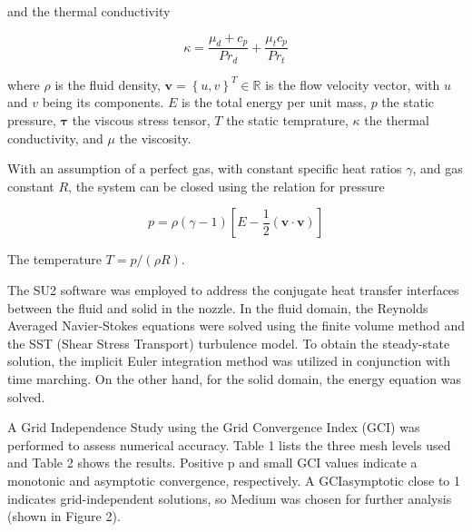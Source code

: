 and the thermal conductivity

\begin{equation}
    \kappa = \frac{\mu_d + c_p}{Pr_d} + \frac{\mu_t c_p}{Pr_t}
    \label{eq:kappa}
\end{equation}

where $\rho$ is the fluid density, $\mathbf{v} = \left\{ u , v \right\}^T \in \mathbb{R}$ is the flow velocity vector, with $u$ and $v$ being its components. $E$ is the total energy per unit mass, $p$ the static pressure, $\boldsymbol{\tau}$ the viscous stress tensor, $T$ the static temprature, $\kappa$ the thermal conductivity, and $\mu$ the viscosity.

With an assumption of a perfect gas, with constant specific heat ratios $\gamma$, and gas constant $R$, the system can be closed using the relation 
for pressure

\begin{equation}
    p = \rho \left( \gamma - 1 \right) \left[ E - \frac{1}{2} \left( \mathbf{v} \cdot \mathbf{v} \right) \right]
    \label{eq:pressure}
\end{equation}

The temperature $T=p/(\rho R)$.

The SU2 software \cite{Economon2016a} was employed to address the conjugate heat transfer interfaces between the fluid and solid in the nozzle. In the fluid domain, the Reynolds Averaged Navier-Stokes equations were solved using the finite volume method and the SST (Shear Stress Transport) turbulence model. To obtain the steady-state solution, the implicit Euler integration method was utilized in conjunction with time marching. On the other hand, for the solid domain, the energy equation was solved.

A Grid Independence Study using the Grid Convergence Index (GCI) \cite{Roache1994} was performed to assess numerical accuracy. Table 1 lists the three mesh levels used and Table 2 shows the results. Positive p and small GCI values indicate a monotonic and asymptotic convergence, respectively. A GCIasymptotic close to 1 indicates grid-independent solutions, so Medium was chosen for further analysis (shown in Figure 2).


